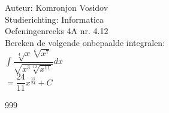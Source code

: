 \documentclass[a4paper]{article}
\newcommand{\dint}{\displaystyle\int}
\begin{document}
	
	\noindent \large Auteur: Komronjon Vosidov \\
	\noindent \large Studierichting: Informatica\\
	\noindent \large Oefeningenreeks 4A nr. 4.12\\
	
	
	\medskip
	\normalsize
	Bereken de volgende onbepaalde integralen:\\
	
	$\dint \dfrac{\sqrt[4]{x} \sqrt[6]{x^7}}{\sqrt{x^3 \sqrt[12]{x^{11}}}}  dx $\\

	$=\dfrac{24}{11} x^{\tfrac{11}{24}} + C $

	
\begin{thebibliography}{999}
\end{thebibliography}		
\end{document}
